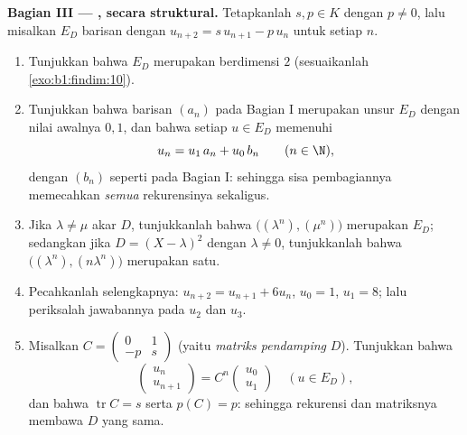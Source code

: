 \begin{problem}
\medskip
\noindent\textbf{Bagian III --- , secara struktural.}
Tetapkanlah $s, p \in K$ dengan $p \neq 0$, lalu misalkan $E_D$ 
barisan dengan $u_{n+2} = s\,u_{n+1} - p\,u_n$ untuk setiap $n$.
\begin{enumerate}[resume]
  \item Tunjukkan bahwa $E_D$ merupakan  berdimensi $2$
        (sesuaikanlah \cref{exo:b1:findim:10}).
  \item Tunjukkan bahwa barisan $(a_n)$ pada Bagian I merupakan unsur
        $E_D$ dengan nilai awalnya $0, 1$, dan bahwa setiap $u
        \in E_D$ memenuhi
        \[
        u_n = u_1\,a_n + u_0\,b_n \qquad (n \in \N),
        \]
        dengan $(b_n)$ seperti pada Bagian I: sehingga sisa pembagiannya memecahkan
        \emph{semua} rekurensinya sekaligus.
  \item Jika $\lambda \neq \mu$ akar $D$, tunjukkanlah bahwa
        $\bigl((\lambda^n), (\mu^n)\bigr)$ merupakan  $E_D$;
        sedangkan jika $D = (X-\lambda)^2$ dengan $\lambda \neq 0$, tunjukkanlah bahwa
        $\bigl((\lambda^n), (n\lambda^n)\bigr)$ merupakan satu.
  \item Pecahkanlah selengkapnya: $u_{n+2} = u_{n+1} + 6u_n$, $u_0 = 1$,
        $u_1 = 8$; lalu periksalah jawabannya pada $u_2$ dan $u_3$.
  \item Misalkan $C = \begin{pmatrix} 0 & 1\\ -p & s\end{pmatrix}$
        (yaitu \emph{matriks pendamping} $D$). Tunjukkan bahwa
        \[
        \begin{pmatrix} u_{n}\\ u_{n+1}\end{pmatrix}
        = C^n \begin{pmatrix} u_0\\ u_1\end{pmatrix}
        \quad (u \in E_D),
        \]
        dan bahwa $\operatorname{tr} C = s$ serta $p(C) = p$: sehingga
        rekurensi dan matriksnya membawa  $D$ yang sama.
\end{enumerate}


\end{problem}
